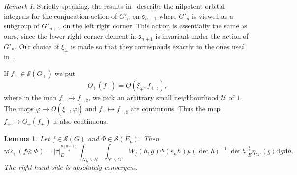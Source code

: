 \documentclass[letterpaper,11pt]{amsart}
\newcommand{\fs}{\mathfrak{s}}
\newcommand{\cS}{\mathcal{S}}
\newcommand{\cU}{\mathcal{U}}
\newcommand{\rd}{\mathrm{d}}
\newcommand{\bs}{\backslash}
\newcommand{\<}{\negthickspace}
\providecommand{\abs}[1]{\lvert#1\rvert}
\theoremstyle{definition}
\theoremstyle{plain}
\newtheorem{lemma}[definition]{Lemma}
\theoremstyle{remark}
\newtheorem{remark}[definition]{Remark}
\numberwithin{equation}{section}
\begin{document}
\begin{remark}  \label{remark:compare_BP}
Strictly speaking, the results in~\cite{BP1} describe the nilpotent orbital
integrals for the conjucation action of $G'_n$ on $\fs_{n+1}$ where $G'_n$ is
viewed as a subgroup of $G'_{n+1}$ on the left right corner. This action is
essentially the same as ours, since the lower right corner element in
$\fs_{n+1}$ is invariant under the action of $G'_n$. Our choice of $\xi_\pm$
is made so that they corresponds exactly to the ones used in~\cite{BP1}.
\end{remark}

If $f_+ \in \cS(G_{+})$ we put
    \[
    O_+(f_+) = O(\xi_+, f_{+, \natural}),
    \]
where in the map $f_+ \mapsto f_{+, \natural}$, we pick an
arbitrary small neighbourhood $\cU$ of $1$. The maps $\varphi \mapsto O(\xi_+, \varphi)$ and $f_+
\mapsto f_{+, \natural}$ are continuous. Thus the map $f_+ \mapsto O_+(f_+)$
is also continuous.






\begin{lemma}   \label{lemma:reg_unipotent_Whittaker}
Let $f\in \cS(G)$ and $\Phi \in\cS(E_n)$. Then
    \begin{equation}    \label{eq:reg_unipotent_Whittaker}
    \gamma O_+(f \otimes \Phi)
     = \abs{\tau}_E^{\frac{n(n-1)}{4}}
    \int_{N_H \bs H}
    \int_{N' \bs G'} W_{f}(h, g) \Phi(e_n h) \mu(\det h)^{-1}
    \abs{\det h}_E^{\frac{1}{2}} \eta_{G'}(g) \rd g \rd h.
    \end{equation}
The right hand side is absolutely convergent.
\end{lemma}
\end{document}
